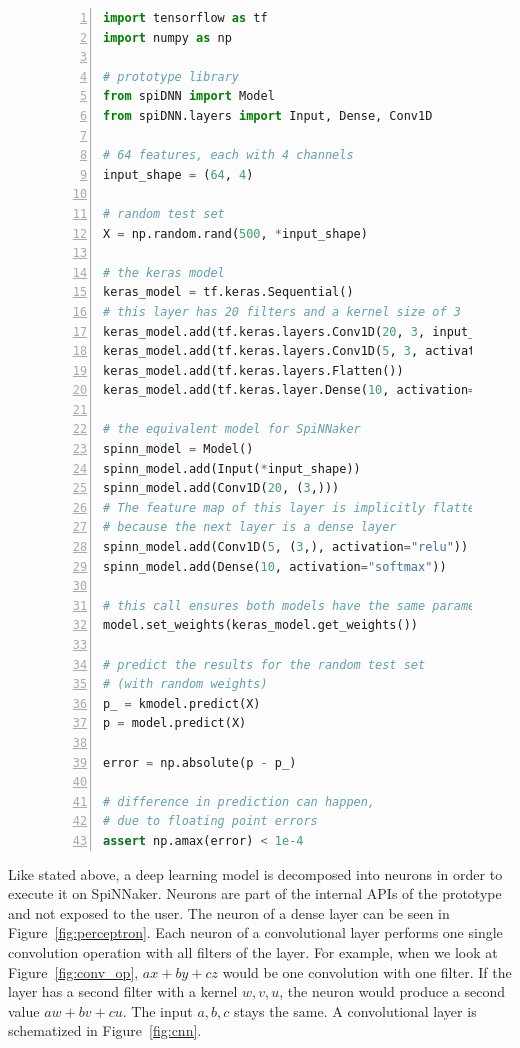 \documentclass[]{article}
\begin{document}
\begin{figure} %
\begin{lstlisting}[language=Python, caption={Example code comparing
  1D CNNs in Keras to the prototype.}, captionpos=b,
  label=lst:spiDNN_vs_keras_cnns, numbers=left]
import tensorflow as tf
import numpy as np

# prototype library
from spiDNN import Model
from spiDNN.layers import Input, Dense, Conv1D

# 64 features, each with 4 channels
input_shape = (64, 4)

# random test set
X = np.random.rand(500, *input_shape)

# the keras model
keras_model = tf.keras.Sequential()
# this layer has 20 filters and a kernel size of 3
keras_model.add(tf.keras.layers.Conv1D(20, 3, input_shape=input_shape))
keras_model.add(tf.keras.layers.Conv1D(5, 3, activation="relu"))
keras_model.add(tf.keras.layers.Flatten())
keras_model.add(tf.keras.layer.Dense(10, activation="softmax"))

# the equivalent model for SpiNNaker
spinn_model = Model()
spinn_model.add(Input(*input_shape))
spinn_model.add(Conv1D(20, (3,)))
# The feature map of this layer is implicitly flattened,
# because the next layer is a dense layer
spinn_model.add(Conv1D(5, (3,), activation="relu"))
spinn_model.add(Dense(10, activation="softmax"))

# this call ensures both models have the same parameters
model.set_weights(keras_model.get_weights())

# predict the results for the random test set
# (with random weights)
p_ = kmodel.predict(X)
p = model.predict(X)

error = np.absolute(p - p_)

# difference in prediction can happen,
# due to floating point errors
assert np.amax(error) < 1e-4
\end{lstlisting}
\end{figure} %

Like stated above, a deep learning model is decomposed into neurons
in order to execute it on SpiNNaker.
Neurons are part of the internal APIs of the prototype and not exposed
to the user.
The neuron of a dense layer can be seen in
Figure~\ref{fig:perceptron}.
Each neuron of a convolutional layer performs one single convolution
operation with all filters of the layer.
For example, when we look at Figure~\ref{fig:conv_op}, $ax + by + cz$
would be one convolution with one filter.
If the layer has a second filter with a kernel $w, v, u$, the neuron
would produce a second value $aw + bv + cu$.
The input $a, b, c$ stays the same.
A convolutional layer is schematized in Figure~\ref{fig:cnn}.
\end{document}
